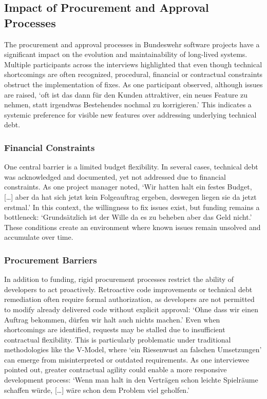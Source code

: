 \subsection{Impact of Procurement and Approval Processes}
The procurement and approval processes in Bundeswehr software projects have a significant impact on the evolution and maintainability of long-lived systems. Multiple participants across the interviews highlighted that even though technical shortcomings are often recognized, 
procedural, financial or contractual constraints obstruct the implementation of fixes. As one participant observed, although issues are raised, `oft ist das dann für den Kunden attraktiver, ein neues Feature zu nehmen, statt irgendwas Bestehendes nochmal zu korrigieren.'
This indicates a systemic preference for visible new features over addressing underlying technical debt.

\subsubsection{Financial Constraints}
One central barrier is a limited budget flexibility. In several cases, technical debt was acknowledged and documented, yet not addressed due to financial constraints. As one project manager noted, `Wir hatten halt ein festes Budget, [\ldots] aber da hat sich jetzt kein Folgeauftrag ergeben, deswegen liegen sie da jetzt erstmal.'
In this context, the willingness to fix issues exist, but funding remains a bottleneck: `Grundsätzlich ist der Wille da es zu beheben aber das Geld nicht.' These conditions create an environment where known issues remain unsolved and accumulate over time.

\subsubsection{Procurement Barriers}
In addition to funding, rigid procurement processes restrict the ability of developers to act proactively. Retroactive code improvements or technical debt remediation often require formal authorization, as developers are not permitted to modify already delivered code without explicit approval:
`Ohne dass wir einen Auftrag bekommen, dürfen wir halt auch nichts machen.' Even when shortcomings are identified, requests may be stalled due to insufficient contractual flexibility. This is particularly problematic under traditional methodologies like the V-Model, where
`ein Riesenwust an falschen Umsetzungen' can emerge from misinterpreted or outdated requirements. As one interviewee pointed out, greater contractual agility could enable a more responsive development process:
`Wenn man halt in den Verträgen schon leichte Spielräume schaffen würde, [\ldots] wäre schon dem Problem viel geholfen.'\\

